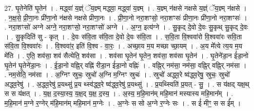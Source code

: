 \documentclass[17pt]{extarticle}
\begin{document}
27. घृ॒तेनेति॑ घृ॒तेन॑ । . मद्ध्वा॑ य॒ज्ञ्ं ॅय॒ज्ञ्म् मद्ध्वा॒ मद्ध्वा॑ य॒ज्ञ्म् । . य॒ज्ञ्म् न॑क्षसे नक्षसे य॒ज्ञ्ं ॅय॒ज्ञ्म् न॑क्षसे । . न॒क्ष॒से॒ प्री॒णा॒नः प्री॑णा॒नो न॑क्षसे नक्षसे प्रीणा॒नः । . प्री॒णा॒नो नरा॒शꣳसो॒ नरा॒शꣳसः॑ प्रीणा॒नः प्री॑णा॒नो नरा॒शꣳसः॑ । . नरा॒शꣳसो॑ अग्ने अग्ने॒ नरा॒शꣳसो॒ नरा॒शꣳसो॑ अग्ने । . अ॒ग्न॒ इत्य॑ग्ने । . सु॒कृद् दे॒वो दे॒वः सु॒कृथ् सु॒कृद् दे॒वः । . सु॒कृदिति॑ सु - कृत् । . दे॒वः स॑वि॒ता स॑वि॒ता दे॒वो दे॒वः स॑वि॒ता । . स॒वि॒ता वि॒श्ववा॑रो वि॒श्ववा॑रः सवि॒ता स॑वि॒ता वि॒श्ववा॑रः । . वि॒श्ववा॑र॒ इति॑ वि॒श्व - वा॒रः॒ । . अच्छा॒य म॒य मच्छा च्छा॒यम् । . अ॒य मे᳚त्ये त्य॒य म॒य मे॑ति । . ए॒ति॒ शव॑सा॒ शव॑ सैत्येति॒ शव॑सा । . शव॑सा घृ॒तेन॑ घृ॒तेन॒ शव॑सा॒ शव॑सा घृ॒तेन॑ । . घृ॒तेने॑डा॒न ई॑डा॒नो घृ॒तेन॑ घृ॒तेने॑डा॒नः । . ई॒डा॒नो वह्नि॒र् वह्नि॑ रीडा॒न ई॑डा॒नो वह्निः॑ । . वह्नि॒र् नम॑सा॒ नम॑सा॒ वह्नि॒र् वह्नि॒र् नम॑सा । . नम॒सेति॒ नम॑सा । . अ॒ग्निꣳ स्रुचः॒ स्रुचो॑ अ॒ग्नि म॒ग्निꣳ स्रुचः॑ । . स्रुचो॑ अद्ध्व॒रे ष्व॑द्ध्व॒रेषु॒ स्रुचः॒ स्रुचो॑ अद्ध्व॒रेषु॑ । . अ॒द्ध्व॒रेषु॑ प्र॒यथ्सु॑ प्र॒य थ्स्व॑द्ध्व॒रे ष्व॑द्ध्व॒रेषु॑ प्र॒यथ्सु॑ । . प्र॒यथ्स्विति॑ प्र॒यत् - सु॒ । . स य॑क्षद् यक्ष॒थ् स स य॑क्षत् । . य॒क्ष॒ द॒स्या॒स्य॒ य॒क्ष॒द् य॒क्ष॒ द॒स्य॒ । . अ॒स्य॒ म॒हि॒मान॑म् महि॒मान॑ मस्यास्य महि॒मान᳚म् । . म॒हि॒मान॑ म॒ग्ने र॒ग्नेर् म॑हि॒मान॑म् महि॒मान॑ म॒ग्नेः । . अ॒ग्नेः स सो अ॒ग्ने र॒ग्नेः सः । . स ई॑ मीꣳ॒॒ स स ई᳚म् । \newline
\end{document}
